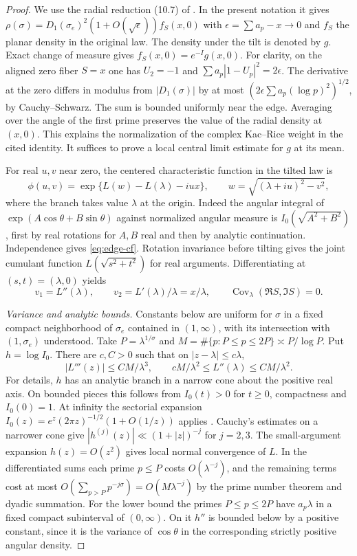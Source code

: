 \documentclass[11pt]{article}
\begin{document}
\begin{proof}
We use the radial reduction (10.7) of \cite{vm004}. In the present
notation it gives $\rho(\sigma)=D_1(\sigma_e)^2
(1+O(\sqrt{\epsilon})) f_S(x,0)$ with
$\epsilon=\sum a_p-x\to0$ and $f_S$ the planar density in the original
law. The density under the tilt is denoted by $g$. Exact change of
measure gives $f_S(x,0)=e^{-I}g(x,0)$. For clarity, on the aligned zero fiber $S=x$ one has $U_2=-1$ and $\sum a_p|1-U_p|^2=2\epsilon$. The derivative at the zero differs in modulus from $|D_1(\sigma)|$ by at most $(2\epsilon\sum a_p(\log p)^2)^{1/2}$, by Cauchy--Schwarz. The sum is bounded uniformly near the edge. Averaging over the angle of the first prime preserves the value of the radial density at $(x,0)$. This explains the normalization of the complex Kac--Rice weight in the cited identity. It suffices to prove a local
central limit estimate for $g$ at its mean.

For real $u,v$ near zero, the centered characteristic function in the
tilted law is
\begin{equation}
 \phi(u,v)=\exp\{L(w)-L(\lambda)-iux\},\qquad
 w=\sqrt{(\lambda+iu)^2-v^2},
 \label{eq:edge-cf}
\end{equation}
where the branch takes value $\lambda$ at the origin. Indeed the angular
integral of $\exp(A\cos\theta+B\sin\theta)$ against normalized angular
measure is $I_0(\sqrt{A^2+B^2})$, first by real rotations for $A,B$
real and then by analytic continuation. Independence gives
\eqref{eq:edge-cf}. Rotation invariance before tilting gives the
joint cumulant function $L(\sqrt{s^2+t^2})$ for real arguments.
Differentiating at $(s,t)=(\lambda,0)$ yields
\[
 v_1=L''(\lambda),\qquad v_2=L'(\lambda)/\lambda=x/\lambda,
 \qquad \operatorname{Cov}_\lambda(\Re S,\Im S)=0.
\]

\emph{Variance and analytic bounds.}
Constants below are uniform for $\sigma$ in a fixed compact
neighborhood of $\sigma_e$ contained in $(1,\infty)$, with its
intersection with $(1,\sigma_e)$ understood. Take
$P=\lambda^{1/\sigma}$ and $M=\#\{p:P\le p\le2P\}
\asymp P/\log P$. Put $h=\log I_0$. There are $c,C>0$ such that on
$|z-\lambda|\le c\lambda$,
\[
 |L'''(z)|\le C M/\lambda^3,\qquad
 cM/\lambda^2\le L''(\lambda)\le C M/\lambda^2 .
\]
For details, $h$ has an analytic branch in a narrow cone about the
positive real axis. On bounded pieces this follows from $I_0(t)>0$
for $t\ge0$, compactness and $I_0(0)=1$. At infinity the sectorial
expansion $I_0(z)=e^z(2\pi z)^{-1/2}(1+O(1/z))$ applies
\cite[\S10.40]{dlmf}. Cauchy's estimates on a narrower cone give
$|h^{(j)}(z)|\ll(1+|z|)^{-j}$ for $j=2,3$.
The small-argument expansion $h(z)=O(z^2)$ gives local normal
convergence of $L$. In the differentiated sums each prime $p\le P$
costs $O(\lambda^{-j})$, and the remaining terms cost at most
$O(\sum_{p>P}p^{-j\sigma})=O(M\lambda^{-j})$ by the prime number
theorem and dyadic summation. For the lower bound the primes
$P\le p\le2P$ have $a_p\lambda$ in a fixed compact subinterval of
$(0,\infty)$. On it $h''$ is bounded below by a positive constant,
since it is the variance of $\cos\theta$ in the corresponding
strictly positive angular density.


\end{proof}
\end{document}
